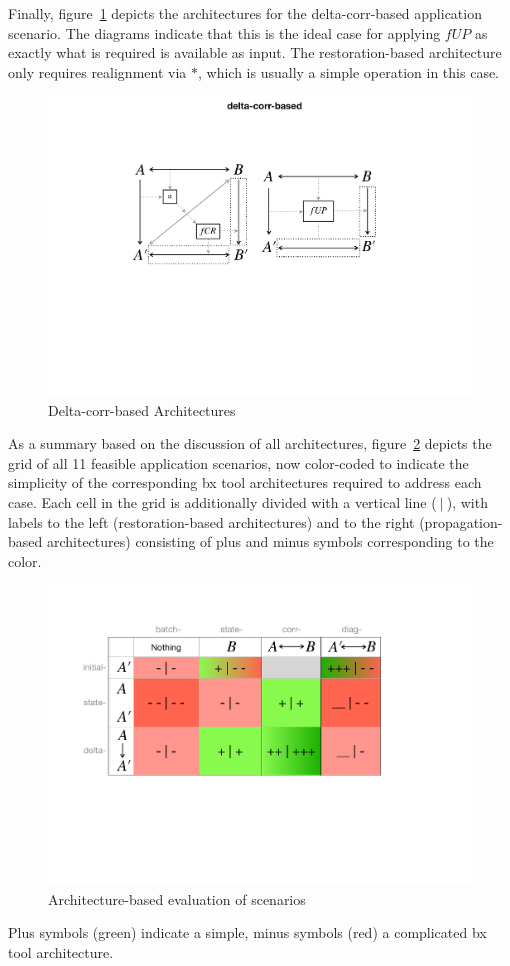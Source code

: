 Finally, figure~\ref{fig:deltaCorrBased} depicts the architectures for the delta-corr-based application scenario.
The diagrams indicate that this is the ideal case for applying $\mathit{fUP}$ as exactly what is required is available as input.
The restoration-based architecture only requires realignment via $\ast$, which is usually a simple operation in this case.
\begin{figure}[tb!]
	\centering
	\includegraphics[width=0.75\columnwidth]{diagrams/foundations/delta-corr-based}
	\caption{Delta-corr-based Architectures}
	\label{fig:deltaCorrBased}
\end{figure}

As a summary based on the discussion of all architectures, figure~\ref{fig:evalOfApplicationScenarios} depicts the grid of all 11 feasible application scenarios, now color-coded to indicate the simplicity of the corresponding bx tool architectures required to address each case.
Each cell in the grid is additionally divided with a vertical line ($~|~$), with labels to the left (restoration-based architectures) and to the right (propagation-based architectures) consisting of plus and minus symbols corresponding to the color.
\begin{figure}[tb!]
	\centering
	\includegraphics[width=0.9\columnwidth]{diagrams/foundations/EvalOfApplicationScenarios.pdf}
	\caption{Architecture-based evaluation of scenarios}
	\label{fig:evalOfApplicationScenarios}
\end{figure}
Plus symbols (green) indicate a simple, minus symbols (red) a complicated bx tool architecture.  

